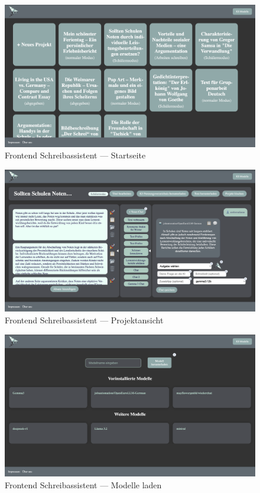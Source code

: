 \documentclass[../main.tex]{subfiles}
\begin{document}
\begin{figure}[h]
    \centering
    \includegraphics[width=1\textwidth]{bilder/frontend_1.png}
    \caption{Frontend Schreibassistent — Startseite}
    \label{fig:fe1}
\end{figure}
\begin{figure}[h] 
    \centering
    \includegraphics[width=1\textwidth]{bilder/frontend_2.png} 
    \caption{Frontend Schreibassistent — Projektansicht}
    \label{fig:fe2}
\end{figure}
\begin{figure}[h] 
    \centering
    \includegraphics[width=1\textwidth]{bilder/frontend_3.png}
    \caption{Frontend Schreibassistent — Modelle laden}
    \label{fig:fe3}
\end{figure}
\end{document}
